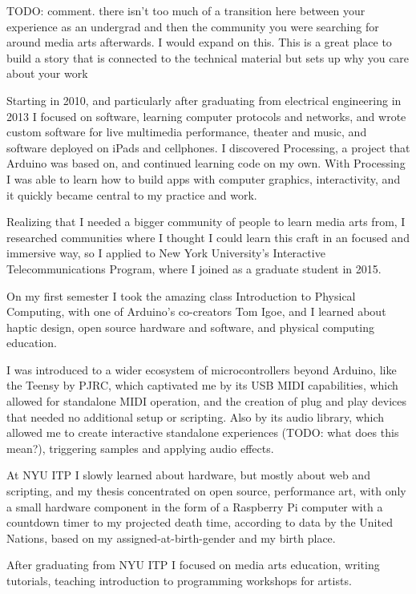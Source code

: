 TODO: comment. there isn't too much of a transition here between your experience as an undergrad and then the community you were searching for around media arts afterwards. I would expand on this. This is a great place to build a story that is connected to the technical material but sets up why you care about your work

Starting in 2010, and particularly after graduating from electrical engineering in 2013 I focused on software, learning computer protocols and networks, and wrote custom software for live multimedia performance, theater and music, and software deployed on iPads and cellphones. I discovered Processing, a project that Arduino was based on, and continued learning code on my own. With Processing I was able to learn how to build apps with computer graphics, interactivity, and it quickly became central to my practice and work.

Realizing that I needed a bigger community of people to learn media arts from, I researched communities where I thought I could learn this craft in an focused and immersive way, so I applied to New York University's Interactive Telecommunications Program, where I joined as a graduate student in 2015.

On my first semester I took the amazing class Introduction to Physical Computing, with one of Arduino's co-creators Tom Igoe, and I learned about haptic design, open source hardware and software, and physical computing education.

I was introduced to a wider ecosystem of microcontrollers beyond Arduino, like the Teensy by PJRC, which captivated me by its USB MIDI capabilities, which allowed for standalone MIDI operation, and the creation of plug and play devices that needed no additional setup or scripting. Also by its audio library, which allowed me to create interactive standalone experiences (TODO: what does this mean?), triggering samples and applying audio effects.

At NYU ITP I slowly learned about hardware,  but mostly about web and scripting, and my thesis concentrated on open source, performance art, with only a small hardware component in the form of a Raspberry Pi computer with a countdown timer to my projected death time, according to data by the United Nations, based on my assigned-at-birth-gender and my birth place.

After graduating from NYU ITP I focused on media arts education, writing tutorials, teaching introduction to programming workshops for artists.

